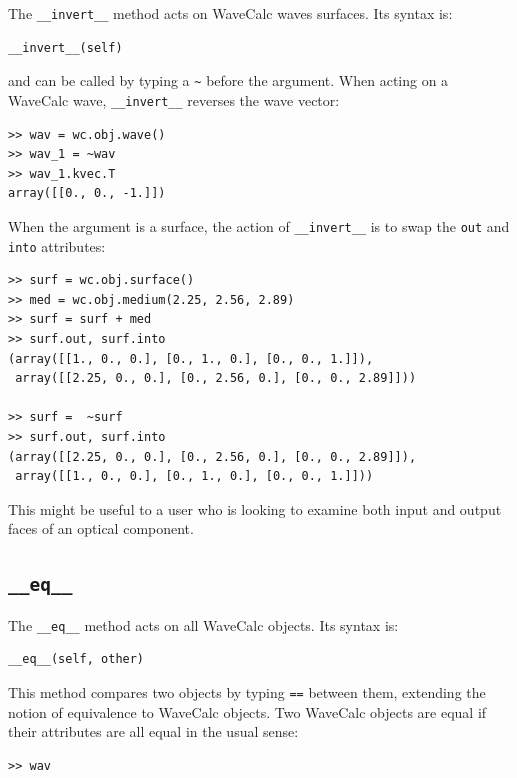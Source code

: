 \documentclass[11pt, reqno]{book}%
\newcounter{ct}
\newcommand{\tw}[1]{{\tt #1}}
\begin{document}
The \tw{\_\_invert\_\_} method acts on WaveCalc waves surfaces. Its syntax is:
\begin{verbatim}
__invert__(self)
\end{verbatim}
\noindent and can be called by typing a \verb|~| before the argument. When acting on a WaveCalc wave, \tw{\_\_invert\_\_} reverses the wave vector:
\begin{verbatim}
>> wav = wc.obj.wave()
>> wav_1 = ~wav
>> wav_1.kvec.T
array([[0., 0., -1.]])
\end{verbatim}
When the argument is a surface, the action of \tw{\_\_invert\_\_} is to swap the \tw{out} and \tw{into} attributes:
\begin{verbatim}
>> surf = wc.obj.surface()
>> med = wc.obj.medium(2.25, 2.56, 2.89)
>> surf = surf + med
>> surf.out, surf.into
(array([[1., 0., 0.], [0., 1., 0.], [0., 0., 1.]]), 
 array([[2.25, 0., 0.], [0., 2.56, 0.], [0., 0., 2.89]]))

>> surf =  ~surf
>> surf.out, surf.into
(array([[2.25, 0., 0.], [0., 2.56, 0.], [0., 0., 2.89]]),
 array([[1., 0., 0.], [0., 1., 0.], [0., 0., 1.]]))
\end{verbatim}
\noindent This might be useful to a user who is looking to examine both input and output faces of an optical component.















\subsection{\tw{\_\_eq\_\_} }
\label{sec:eqmethod}

The \tw{\_\_eq\_\_} method acts on all WaveCalc objects. Its syntax is:
\begin{verbatim}
__eq__(self, other)
\end{verbatim}
This method compares two objects by typing \tw{==} between them, extending the notion of equivalence to WaveCalc objects. Two WaveCalc objects are equal if their attributes are all equal in the usual sense:
\begin{verbatim}
>> wav
\end{verbatim}
\end{document}
